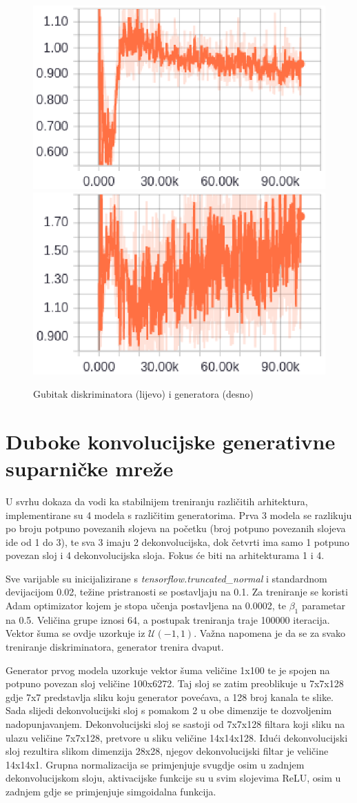 \documentclass[times, utf8, diplomski]{fer}
\begin{document}
\begin{figure}[H]
\begin{center}
\includegraphics[width=.4\textwidth]{GANdiscloss}
\includegraphics[width=.4\textwidth]{GANgenloss}
\end{center}
\caption{Gubitak diskriminatora (lijevo) i generatora (desno)}
\end{figure}

\pagebreak

\section{Duboke konvolucijske generativne suparničke mreže}
U svrhu dokaza da \cite{radford} vodi ka stabilnijem treniranju različitih arhitektura, implementirane su 4 modela s različitim generatorima. Prva 3 modela se razlikuju po broju potpuno povezanih slojeva na početku (broj potpuno povezanih slojeva ide od 1 do 3), te sva 3 imaju 2 dekonvolucijska, dok četvrti ima samo 1 potpuno povezan sloj i 4 dekonvolucijska sloja. Fokus će biti na arhitekturama 1 i 4. \par

Sve varijable su inicijalizirane s \textit{tensorflow.truncated\_normal} i standardnom devijacijom 0.02, težine pristranosti se postavljaju na 0.1. Za treniranje se koristi Adam optimizator kojem je stopa učenja postavljena na 0.0002, te $\beta_1$ parametar na 0.5. Veličina grupe iznosi 64, a postupak treniranja traje 100000 iteracija. Vektor šuma se ovdje uzorkuje iz $\mathcal{U}(-1,1)$. Važna napomena je da se za svako treniranje diskriminatora, generator trenira dvaput.\par

Generator prvog modela uzorkuje vektor šuma veličine 1x100 te je spojen na potpuno povezan sloj veličine 100x6272. Taj sloj se zatim preoblikuje u 7x7x128 gdje 7x7 predstavlja sliku koju generator povećava, a 128 broj kanala te slike. Sada slijedi dekonvolucijski sloj s pomakom 2 u obe dimenzije te dozvoljenim nadopunjavanjem. Dekonvolucijski sloj se sastoji od 7x7x128 filtara koji sliku na ulazu veličine 7x7x128, pretvore u sliku veličine 14x14x128. Idući dekonvolucijski sloj rezultira slikom dimenzija 28x28, njegov dekonvolucijski filtar je veličine 14x14x1. Grupna normalizacija se primjenjuje svugdje osim u zadnjem dekonvolucijskom sloju, aktivacijske funkcije su u svim slojevima ReLU, osim u zadnjem gdje se primjenjuje simgoidalna funkcija. \par
\end{document}
